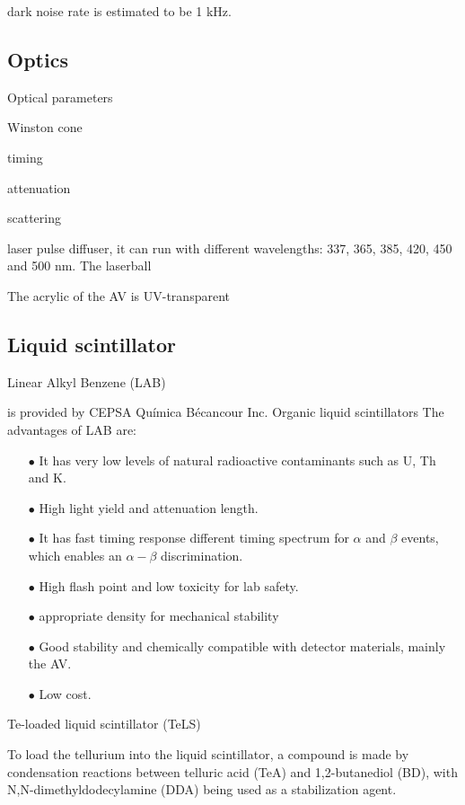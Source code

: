 dark noise rate is estimated to be 1 kHz.



\subsection{Optics}

Optical parameters

Winston cone



timing


attenuation

scattering


laser pulse diffuser, it can run with different wavelengths: 337, 365, 385, 420, 450 and 500 nm.
The laserball 

The acrylic of the AV is UV-transparent



\subsection{Liquid scintillator}


Linear Alkyl Benzene (LAB)

is provided by CEPSA Qu\'{i}mica B\'ecancour Inc.
Organic liquid scintillators 
The advantages of LAB are:

\begin{itemize}
	\item[$\bullet$] It has very low levels of natural radioactive contaminants such as U, Th and K.
	\item[$\bullet$] High light yield and attenuation length.
	\item[$\bullet$] It has fast timing response 
	different timing spectrum for $\alpha$ and $\beta$ events, which enables an $\alpha-\beta$ discrimination. 
	\item[$\bullet$] High flash point and low toxicity for lab safety.
	\item[$\bullet$] appropriate density for mechanical stability
	\item[$\bullet$] Good stability and chemically compatible with detector materials, mainly the AV.
	\item[$\bullet$] Low cost.
\end{itemize}


Te-loaded liquid scintillator (TeLS)

To load the tellurium into the liquid scintillator, a compound is made by 
condensation reactions between telluric acid (TeA) and 1,2-butanediol (BD), with N,N-dimethyldodecylamine (DDA) being used as a stabilization agent.


